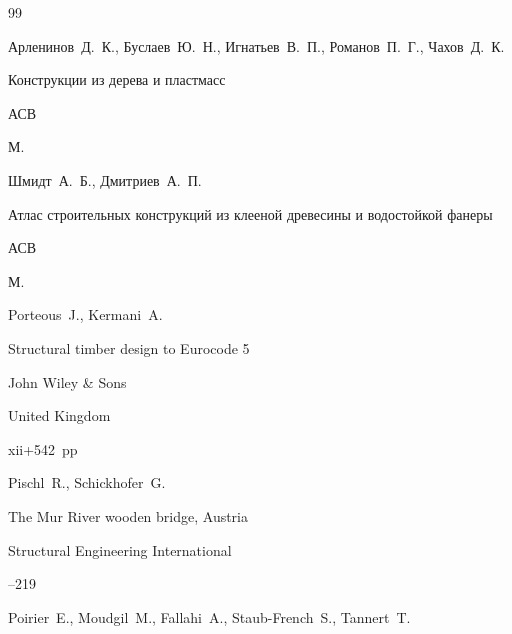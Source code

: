\begin{thebibliography}{99}




\by Арленинов~Д.~К., Буслаев~Ю.~Н., Игнатьев~В.~П., Романов~П.~Г., Чахов~Д.~К.

\book Конструкции из дерева и пластмасс


\publ АСВ

\publaddr М.







\by Шмидт~А.~Б., Дмитриев~А.~П.

\book Атлас строительных конструкций из клееной древесины и водостойкой фанеры 


\publ АСВ

\publaddr М.







\by Porteous~J., Kermani~A.

\book Structural timber design to Eurocode 5


\publ John Wiley \& Sons

\publaddr United Kingdom

\totalpages xii+542~pp \nofrills





\by Pischl~R., Schickhofer~G. 

\paper The Mur River wooden bridge, Austria 

\jour Structural Engineering International




--219





\by Poirier~E., Moudgil~M., Fallahi~A., Staub-French~S., Tannert~T. 


\end{thebibliography}
